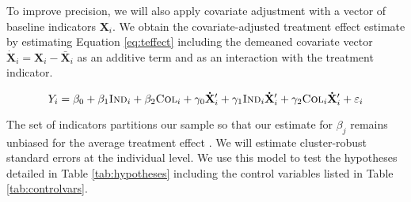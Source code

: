 \documentclass[11pt, a4paper]{article}\usepackage[]{graphicx}\usepackage[]{color}
\begin{document}
        \begin{table}[h]
        \centering
        \caption{Primary hypothesis tests}
        \label{tab:hypotheses}
        \end{table}

        To improve precision, we will also apply covariate adjustment with a vector of baseline indicators $\mathbf{X}_i$. We obtain the covariate-adjusted treatment effect estimate by estimating Equation \ref{eq:teffect} including the demeaned covariate vector $\mathbf{\dot X}_{i} = \mathbf{X}_{i} - \mathbf{\bar X}_{i}$ as an additive term and as an interaction with the treatment indicator. %

        \begin{equation} \label{eq:controls}
            Y_{i} = \beta_{0} + \beta_{1}\text{\textsc{Ind}}_{i} + \beta_{2}\text{\textsc{Col}}_{i} + \gamma_{0} \mathbf{\dot X}'_i + \gamma_{1}\text{\textsc{Ind}}_{i} \mathbf{\dot X}'_i + \gamma_{2}\text{\textsc{Col}}_{i} \mathbf{\dot X}'_i + \varepsilon_{i}
        \end{equation}

        The set of indicators partitions our sample so that our estimate for $\beta_j$ remains unbiased for the average treatment effect \parencite{lin_agnostic_2013}. We will estimate cluster-robust standard errors at the individual level. We use this model to test the hypotheses detailed in Table \ref{tab:hypotheses} including the control variables listed in Table \ref{tab:controlvars}.
\end{document}
